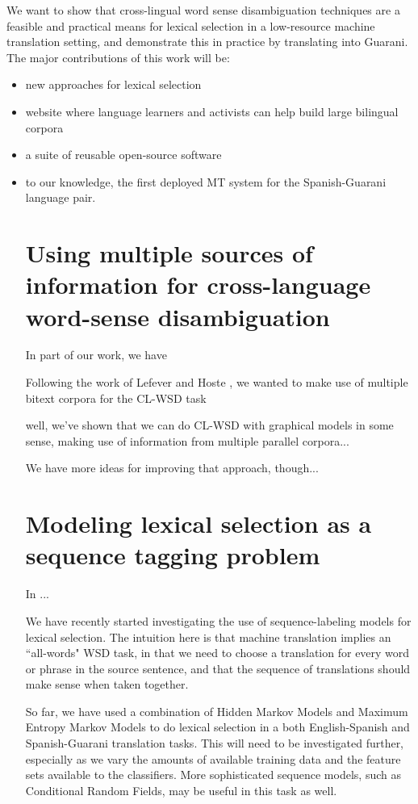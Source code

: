 \documentclass{article}
\begin{document}
We want to show that cross-lingual word sense disambiguation techniques are a
feasible and practical means for lexical selection in a low-resource machine
translation setting, and demonstrate this in practice by translating into
Guarani. The major
contributions of this work will be:
\begin{itemize}
\item new approaches for lexical selection
\item website where language learners and activists can help build large
bilingual corpora
\item a suite of reusable open-source software
\item to our knowledge, the first deployed MT system for the Spanish-Guarani
language pair.
\begin{itemize}

\section{Using multiple sources of information for cross-language word-sense
disambiguation}

In part of our work, we have 

Following the work of Lefever and Hoste
\cite{lefever-hoste-decock:2011:ACL-HLT2011}, we wanted to make use of multiple
bitext corpora for the CL-WSD task


well, we've shown that we can do CL-WSD with graphical models in some sense,
making use of information from multiple parallel corpora...

We have more ideas for improving that approach, though...
\cite{rudnick-liu-gasser:2013:SemEval-2013}

\section{Modeling lexical selection as a sequence tagging problem}
In \cite{rudnick-gasser:2013:HyTra-2013} ...

We have recently started investigating the use of sequence-labeling models for
lexical selection. The intuition here is that machine translation implies an
``all-words" WSD task, in that we need to choose a translation for every word
or phrase in the source sentence, and that the sequence of translations should
make sense when taken together.

So far, we have used a combination of Hidden Markov Models and Maximum Entropy
Markov Models to do lexical selection in a both English-Spanish and
Spanish-Guarani translation tasks. This will need to be investigated further,
especially as we vary the amounts of available training data and the feature
sets available to the classifiers. More sophisticated sequence models, such as
Conditional Random Fields, may be useful in this task as well.


\end{itemize}
\end{itemize}
\end{document}
